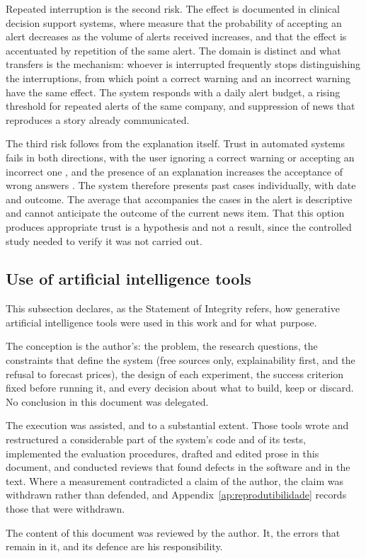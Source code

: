 Repeated interruption is the second risk. The effect is documented in clinical decision support
systems, where \textcite{ancker2017alertfatigue} measure that the probability of accepting an alert
decreases as the volume of alerts received increases, and that the effect is accentuated by
repetition of the same alert. The domain is distinct and what transfers is the mechanism: whoever
is interrupted frequently stops distinguishing the interruptions, from which point a correct
warning and an incorrect warning have the same effect. The system responds with a daily alert
budget, a rising threshold for repeated alerts of the same company, and suppression of news that
reproduces a story already communicated.

The third risk follows from the explanation itself. Trust in automated systems fails in both
directions, with the user ignoring a correct warning or accepting an incorrect one
\autocite{lee2004trust}, and the presence of an explanation increases the acceptance of wrong
answers \autocite{bansal2021whole}. The system therefore presents past cases individually, with
date and outcome. The average that accompanies the cases in the alert is descriptive and cannot
anticipate the outcome of the current news item.
That this option produces appropriate trust is a hypothesis and not a result, since the controlled
study needed to verify it was not carried out.


\subsection{Use of artificial intelligence tools}
\label{sec:met_ia}

This subsection declares, as the Statement of Integrity refers, how generative artificial
intelligence tools were used in this work and for what purpose.

The conception is the author's: the problem, the research questions, the constraints that define
the system (free sources only, explainability first, and the refusal to forecast prices), the
design of each experiment, the success criterion fixed before running it, and every decision about
what to build, keep or discard. No conclusion in this document was delegated.

The execution was assisted, and to a substantial extent. Those tools wrote and restructured a
considerable part of the system's code and of its tests, implemented the evaluation procedures,
drafted and edited prose in this document, and conducted reviews that found defects in the software
and in the text. Where a measurement contradicted a claim of the author, the claim was withdrawn
rather than defended, and Appendix~\ref{ap:reprodutibilidade} records those that were withdrawn.

The content of this document was reviewed by the author. It, the errors that remain in it, and
its defence are his responsibility.
